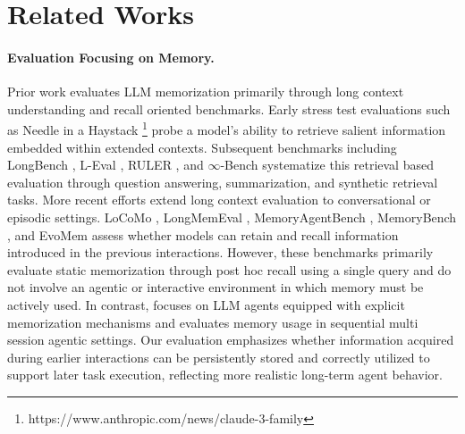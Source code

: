 \section{Related Works}

\paragraph{Evaluation Focusing on Memory.} 
Prior work evaluates LLM memorization primarily through long context understanding and recall oriented benchmarks. Early stress test evaluations such as Needle in a Haystack \footnote{https://www.anthropic.com/news/claude-3-family}
 probe a model’s ability to retrieve salient information embedded within extended contexts. Subsequent benchmarks including LongBench \citep{bai2024longbench}, L-Eval \citep{an2024eval}, RULER \citep{hsieh2024ruler}, and $\infty$-Bench \citep{zhang2024bench} systematize this retrieval based evaluation through question answering, summarization, and synthetic retrieval tasks.
More recent efforts extend long context evaluation to conversational or episodic settings. LoCoMo \citep{maharana2024evaluating}, LongMemEval \citep{wulongmemeval}, MemoryAgentBench \citep{ai2025memorybench}, MemoryBench \citep{ai2025memorybench}, and EvoMem \citep{wei2025evo} assess whether models can retain and recall information introduced in the previous interactions. However, these benchmarks primarily evaluate static memorization through post hoc recall using a single query and do not involve an agentic or interactive environment in which memory must be actively used.
In contrast, \ours focuses on LLM agents equipped with explicit memorization mechanisms and evaluates memory usage in sequential multi session agentic settings. Our evaluation emphasizes whether information acquired during earlier interactions can be persistently stored and correctly utilized to support later task execution, reflecting more realistic long-term agent behavior. 

\vspace{-5pt}
